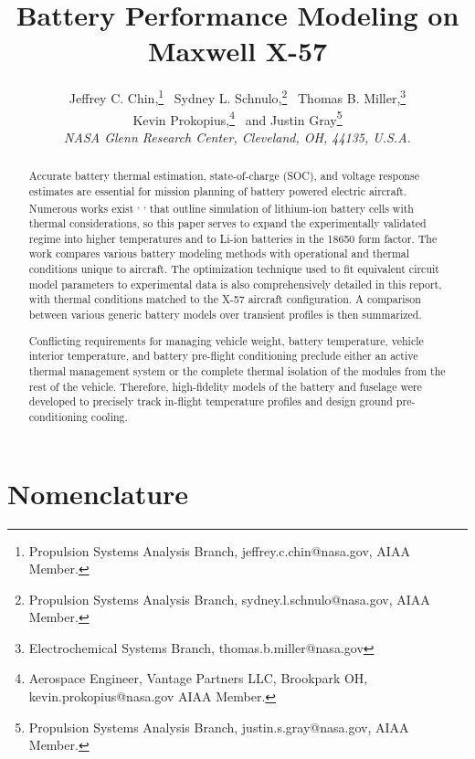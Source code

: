 \documentclass[]{aiaa-tc}%
\title{Battery Performance Modeling on Maxwell X-57}
\author{
  Jeffrey C. Chin,\thanks{Propulsion Systems Analysis Branch, jeffrey.c.chin@nasa.gov, AIAA Member.} \
  Sydney L. Schnulo,\thanks{Propulsion Systems Analysis Branch, sydney.l.schnulo@nasa.gov, AIAA Member.} \
  Thomas B. Miller,\thanks{Electrochemical Systems Branch, thomas.b.miller@nasa.gov} \\
  Kevin Prokopius,\thanks{Aerospace Engineer, Vantage Partners LLC, Brookpark OH, kevin.prokopius@nasa.gov AIAA Member.} \
  and Justin Gray\thanks{Propulsion Systems Analysis Branch, justin.s.gray@nasa.gov, AIAA Member.} \\
  {\normalsize \itshape NASA Glenn Research Center, Cleveland, OH, 44135, U.S.A.} }
\begin{document}
\maketitle

\begin{abstract}

Accurate battery thermal estimation, state-of-charge (SOC), and voltage response estimates are essential for mission planning of battery powered electric aircraft. Numerous works exist \cite{Hu} \textsuperscript{,} \cite{Hu2}\textsuperscript{,} \cite{Fotouhi} that outline simulation of lithium-ion battery cells with thermal considerations, so this paper serves to expand the experimentally validated regime into higher temperatures and to Li-ion batteries in the 18650 form factor. The work compares various battery modeling methods with operational and thermal conditions unique to aircraft. The optimization technique used to fit equivalent circuit model parameters to experimental data is also comprehensively detailed in this report, with thermal conditions matched to the X-57 aircraft configuration. A comparison between various generic battery models over transient profiles is then summarized.

Conflicting requirements for managing vehicle weight, battery temperature, vehicle interior temperature, and battery pre-flight conditioning preclude either an active thermal management system or the complete thermal isolation of the modules from the rest of the vehicle. Therefore, high-fidelity models of the battery and fuselage were developed to precisely track in-flight temperature profiles and design ground pre-conditioning cooling.

\end{abstract}


%
\section{Nomenclature}
\end{document}
